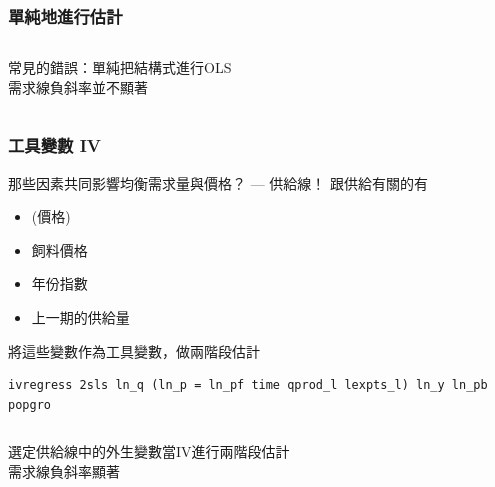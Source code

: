\begin{frame}
    \frametitle{單純地進行估計}

    \begin{columns}
        \begin{column}{0.5\textwidth}
            常見的錯誤：單純把結構式進行OLS\\[3em]
            
            需求線負斜率並不顯著
        \end{column}

        \begin{column}{0.5\textwidth}
            \begin{table}
                \centering
                \scalebox{0.9}{
                
                }
            \end{table}
        \end{column}
    \end{columns}

\end{frame}

\begin{frame}[fragile]
    \frametitle{工具變數 IV}

    那些因素共同影響均衡需求量與價格？ --- 供給線！
    跟供給有關的有
    \begin{itemize}
        \item (價格)
        \item 飼料價格
        \item 年份指數
        \item 上一期的供給量
    \end{itemize}
    
    \vfill 
    
    將這些變數作為工具變數，做兩階段估計
\begin{lstlisting}
ivregress 2sls ln_q (ln_p = ln_pf time qprod_l lexpts_l) ln_y ln_pb popgro\end{lstlisting}

\end{frame}

\begin{frame}
    \begin{columns}
        \begin{column}{0.5\textwidth}
            選定供給線中的外生變數當IV進行兩階段估計\\[3em]
            
            需求線負斜率顯著
        \end{column}

        \begin{column}{0.5\textwidth}
            \begin{table}
                \centering
                \scalebox{0.9}{
                
                }
            \end{table}
        \end{column}
    \end{columns}
\end{frame}


